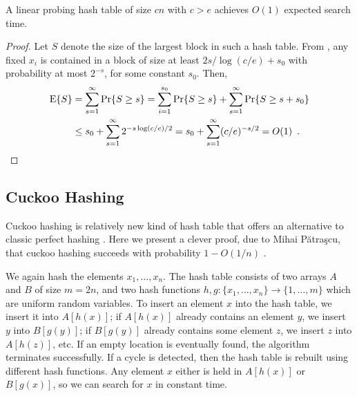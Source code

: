 \documentclass{patmorin}
\begin{document}
\begin{cor}
  A linear probing hash table of size $cn$ with $c > e$ achieves
  $O(1)$ expected search time.
\end{cor}
\begin{proof}
  Let $S$ denote the size of the largest block in such a hash
  table. From , any fixed $x_i$ is contained in
  a block of size at least $2s/\log (c/e) + s_0$ with probability at
  most $2^{-s}$, for some constant $s_0$. Then,
  \begin{align*}
    \operatorname{\mathrm{E}}\{S\} &= \sum_{s = 1}^\infty \Pr\{S \ge s\} = \sum_{i=1}^{s_0} \Pr\{S \ge s\} + \sum_{s = 1}^\infty \Pr\{S \ge s + s_0\} \\
            &\le s_0 + \sum_{s = 1}^\infty 2^{-s \log (c/e)/2} = s_0 + \sum_{s = 1}^\infty (c/e)^{-s/2} = O(1) \enspace . \qedhere
  \end{align*}
\end{proof}

\subsection{Cuckoo Hashing}

Cuckoo hashing is relatively new kind of hash table that offers an
alternative to classic perfect hashing \cite{pagh.rodler:cuckoo}. Here
we present a clever proof, due to Mihai Pătraşcu, that cuckoo hashing
succeeds with probability $1-O(1/n)$ \cite{patrascu:cuckoo}.


We again hash the elements $x_1, \ldots, x_n$. The hash table consists
of two arrays $A$ and $B$ of size $m = 2n$, and two hash functions $h,
g : \{x_1, \ldots, x_n\} \to \{1, \ldots, m\}$ which are uniform
random variables. To insert an element $x$ into the hash table, we
insert it into $A[h(x)]$; if $A[h(x)]$ already contains an element
$y$, we insert $y$ into $B[g(y)]$; if $B[g(y)]$ already contains some
element $z$, we insert $z$ into $A[h(z)]$, etc. If an empty location
is eventually found, the algorithm terminates successfully. If a cycle
is detected, then the hash table is rebuilt using different hash
functions. Any element $x$ either is held in $A[h(x)]$ or $B[g(x)]$,
so we can search for $x$ in constant time.
\end{document}
